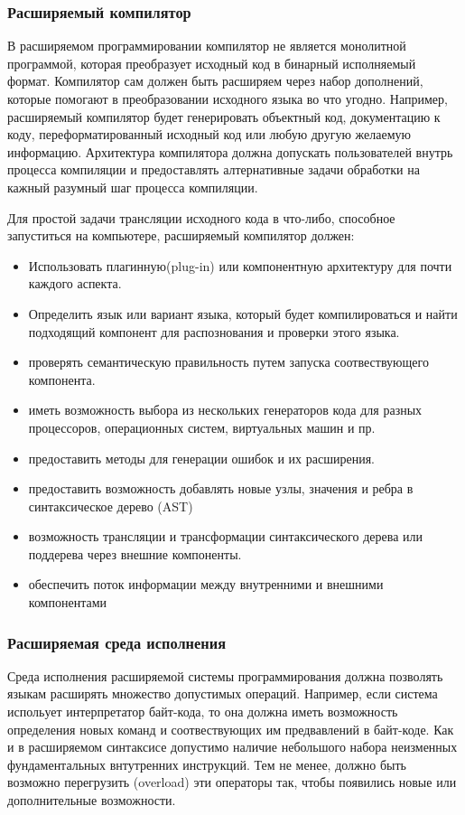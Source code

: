 \documentclass[a4paper,12pt]{article}
\begin{document}
\subsubsection{Расширяемый компилятор}

В расширяемом программировании компилятор не является монолитной программой,
которая преобразует исходный код в бинарный исполняемый формат. Компилятор сам
должен быть расширяем через набор дополнений, которые помогают в преобразовании
исходного языка во что угодно. Например, расширяемый компилятор будет
генерировать объектный код, документацию к коду, переформатированный исходный
код или любую другую желаемую информацию. Архитектура компилятора должна
допускать пользователей внутрь процесса компиляции и предоставлять
алтернативные задачи обработки на кажный разумный шаг процесса компиляции.

Для простой задачи трансляции исходного кода в что-либо, способное запуститься
на компьютере, расширяемый компилятор должен:

\begin{itemize}
  \item Использовать плагинную(plug-in) или компонентную архитектуру для почти
  каждого аспекта.
  \item Определить язык или вариант языка, который будет компилироваться и
  найти подходящий компонент для распознования и проверки этого языка.
  \item проверять семантическую правильность путем запуска соотвествующего
  компонента.
  \item иметь возможность выбора из нескольких генераторов кода для разных
  процессоров, операционных систем, виртуальных машин и пр.
  \item предоставить методы для генерации ошибок и их расширения.
  \item предоставить возможность добавлять новые узлы, значения и ребра в
  синтаксическое дерево (AST)
  \item возможность трансляции и трансформации синтаксического дерева или
  поддерева через внешние компоненты.
  \item обеспечить поток информации между внутренними и внешними компонентами
\end{itemize}

\subsubsection{Расширяемая среда исполнения}
Среда исполнения расширяемой системы программирования должна позволять языкам
расширять множество допустимых операций. Например, если система испольует
интерпретатор байт-кода, то она должна иметь возможность определения новых
команд и соотвествующих им предвавлений в байт-коде. Как и в расширяемом
синтаксисе допустимо наличие небольшого набора неизменных фундаментальных
внтутренних инструкций. Тем не менее, должно быть возможно перегрузить
(overload) эти операторы так, чтобы появились новые или дополнительные
возможности.
\end{document}
